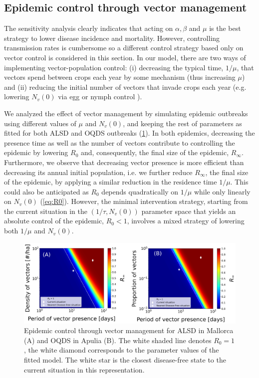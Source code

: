 \subsection{Epidemic control through vector management}

The sensitivity analysis clearly indicates that acting on $\alpha,\beta$
and $\mu$ is the best strategy to lower disease incidence and mortality.
However, controlling transmission rates is cumbersome so a different control
strategy based only on vector control is considered in this section. In our
model, there are two ways of implementing vector-population control: (i)
decreasing the typical time, $1/\mu$, that vectors spend between crops each
year by some mechanism (thus increasing $\mu$) and (ii) reducing the initial
number of vectors that invade crops each year (e.g. lowering $N_v(0)$ via egg
or nymph control \cite{Lago2022}).

We analyzed the effect of vector management by simulating epidemic
outbreaks using different values of $\mu$ and $N_v(0)$, and keeping the rest of
parameters as fitted for both ALSD and OQDS outbreaks
(\cref{fig:control_strategy}). In both epidemics, decreasing the presence time
as well as the number of vectors contribute to controlling the epidemic by
lowering $R_0$ and, consequently, the final size of the epidemic, $R_{\infty}$.
Furthermore, we observe that decreasing vector presence is more efficient than
decreasing its annual initial population, i.e. we further reduce $R_{\infty}$,
the final size of the epidemic, by applying a similar reduction in the
residence time $1/\mu$. This could also be anticipated as $R_0$ depends
quadratically on $1/\mu$ while only linearly on $N_v(0)$ (\cref{eq:R0}).
However, the minimal intervention strategy, starting from the current situation
in the $(1/\tau,N_v(0))$ parameter space that yields an absolute control of the
epidemic, $R_0<1$, involves a mixed strategy of lowering both $1/\mu$ and
$N_v(0)$.

\begin{figure}[H]
    \centering
    \includegraphics[width=\textwidth]{Figures/Control_strategy.png}
    \caption[Epidemic control through vector management for ALSD in Mallorca
        and
        OQDS in Apulia]{Epidemic control through vector management for ALSD in
        Mallorca (A) and OQDS in Apulia (B). The white shaded line denotes
        $R_0=1$, the
        white diamond corresponds to the parameter values of the fitted model.
        The
        white star is the closest disease-free state to the current situation
        in this
        representation.}
    \label{fig:control_strategy}
\end{figure}

